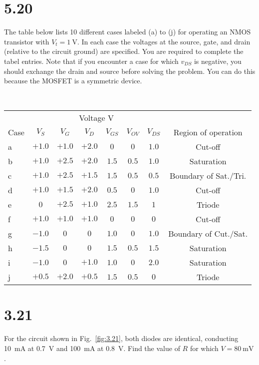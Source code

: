 \documentclass[12pt, a4paper]{article}
\begin{document}
\section{5.20}
The table below lists 10 different cases labeled (a) to (j) for operating an NMOS transistor with $V_t = \SI{1}{\V} $. In each case the voltages at the source, gate, and drain (relative to the circuit ground) are specified. You are required to complete the tabel entries. Note that if you encounter a case for which $v_{DS}$ is negative, you should exchange the drain and source before solving the problem. You can do this because the MOSFET is a symmetric device.


\Ans \\
\begin{center}
  \begin{tabular}{|l|c|c|c|c|c|c|c|}
    \hline
    & \multicolumn{6}{c|}{Voltage \si\V} & \\ \cline{2-7}
    Case & $V_S$ & $V_G$ & $V_D$ & $V_{GS}$ & $V_{OV}$ & $V_{DS}$ & Region of operation \\
    \hline
    a & $+1.0$ & $+1.0$ & $+2.0$ & $0$ & $0$ & $1.0$ & Cut-off \\
    b & $+1.0$ & $+2.5$ & $+2.0$ & $1.5$ & $0.5$ & $1.0$ & Saturation \\
    c & $+1.0$ & $+2.5$ & $+1.5$ & $1.5$ & $0.5$ & $0.5$ & Boundary of Sat./Tri. \\
    d & $+1.0$ & $+1.5$ & $+2.0$ & $0.5$ & $0$ & $1.0$ & Cut-off \\
    e & $0$ & $+2.5$ & $+1.0$ & $2.5$ & $1.5$ & $1$ & Triode \\
    f & $+1.0$ & $+1.0$ & $+1.0$ & $0$ & $0$ & $0$ & Cut-off \\
    g & $-1.0$ & $0$ & $0$ & $1.0$ & $0$ & $1.0$ & Boundary of Cut./Sat. \\
    h & $-1.5$ & $0$ & $0$ & $1.5$ & $0.5$ & $1.5$ & Saturation \\
    i & $-1.0$ & $0$ & $+1.0$ & $1.0$ & $0$ & $2.0$ & Saturation \\
    j & $+0.5$ & $+2.0$ & $+0.5$ & $1.5$ & $0.5$ & $0$ & Triode \\
    \hline
  \end{tabular}
\end{center}

\clearpage
\section{3.21}
For the circuit shown in Fig.~\ref{fig:3.21}, both diodes are identical,
conducting \SI{10}{\mA} at \SI{0.7}{\V} and \SI{100}{\mA}
at \SI{0.8}{\V}. Find the value of $R$ for which $V = \SI{80}{\mV}$.
\end{document}
